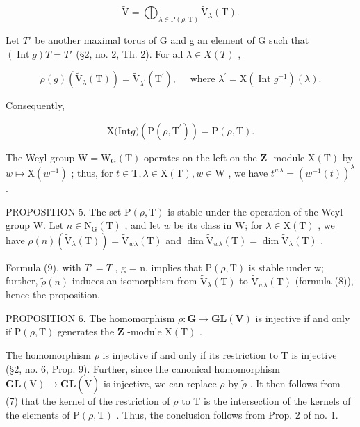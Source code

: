 \[
\tilde {\mathrm{V}} = \bigoplus_ {\lambda \in \mathrm{P} (\rho , \mathrm{T})} \tilde {\mathrm{V}} _ {\lambda} (\mathrm{T}).\tag{7}
\]

Let \(T'\) be another maximal torus of G and g an element of G such that \((\operatorname{Int} g)T = T'\) (§2, no. 2, Th. 2). For all \(\lambda \in X(T)\) ,

\[
\tilde {\rho} (g) (\tilde {\mathrm{V}} _ {\lambda} (\mathrm{T})) = \tilde {\mathrm{V}} _ {\lambda^ {\prime}} (\mathrm{T} ^ {\prime}), \quad \text { where } \lambda^ {\prime} = \mathrm{X} (\operatorname{Int} g ^ {- 1}) (\lambda).\tag{8}
\]

Consequently,

\[
\mathrm{X(Int} g) (\mathrm{P} (\rho , \mathrm{T} ^ {\prime})) = \mathrm{P} (\rho , \mathrm{T}).\tag{9}
\]

The Weyl group \(\mathrm{W} = \mathrm{W}_{\mathrm{G}}(\mathrm{T})\) operates on the left on the \(\mathbf{Z}\) -module \(\mathrm{X(T)}\) by \(w\mapsto \mathrm{X}(w^{-1})\) ; thus, for \(t\in \mathrm{T},\lambda \in \mathrm{X(T)},w\in \mathrm{W}\) , we have \(t^{w\lambda} = (w^{-1}(t))^{\lambda}\) .

PROPOSITION 5. The set \(\mathrm{P}(\rho, \mathrm{T})\) is stable under the operation of the Weyl group W. Let \(n \in \mathrm{N}_{\mathrm{G}}(\mathrm{T})\) , and let \(w\) be its class in W; for \(\lambda \in \mathrm{X}(\mathrm{T})\) , we have \(\rho(n)(\tilde{\mathrm{V}}_{\lambda}(\mathrm{T})) = \tilde{\mathrm{V}}_{w\lambda}(\mathrm{T})\) and \(\dim \tilde{\mathrm{V}}_{w\lambda}(\mathrm{T}) = \dim \tilde{\mathrm{V}}_{\lambda}(\mathrm{T})\) .

Formula (9), with \(T' = T\) , g = n, implies that \(\mathrm{P}(\rho, \mathrm{T})\) is stable under w; further, \(\tilde{\rho}(n)\) induces an isomorphism from \(\tilde{\mathrm{V}}_{\lambda}(\mathrm{T})\) to \(\tilde{\mathrm{V}}_{w\lambda}(\mathrm{T})\) (formula (8)), hence the proposition.

PROPOSITION 6. The homomorphism \(\rho : \mathbf{G} \to \mathbf{GL}(\mathbf{V})\) is injective if and only if \(\mathrm{P}(\rho, \mathrm{T})\) generates the \(\mathbf{Z}\) -module \(\mathrm{X}(\mathrm{T})\) .

The homomorphism \(\rho\) is injective if and only if its restriction to T is injective (§2, no. 6, Prop. 9). Further, since the canonical homomorphism \(\mathbf{GL}(\mathrm{V}) \to \mathbf{GL}(\tilde{\mathrm{V}})\) is injective, we can replace \(\rho\) by \(\tilde{\rho}\) . It then follows from (7) that the kernel of the restriction of \(\rho\) to T is the intersection of the kernels of the elements of \(\mathrm{P}(\rho, \mathrm{T})\) . Thus, the conclusion follows from Prop. 2 of no. 1.

